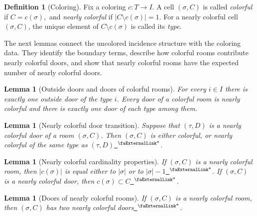 \documentclass{article}
\newtheorem{lemma}[theorem]{Lemma}
\theoremstyle{definition}
\newtheorem{definition}[theorem]{Definition}
\newcommand{\extlink}{~\ensuremath{{}^\text{\faExternalLink*}}}
\begin{document}
\begin{definition}[Coloring]\label{def:coloring}
Fix a coloring $c:T\to I$. A cell $(\sigma,C)$ is called \emph{colorful} if
$C=c(\sigma),$
and \emph{nearly colorful} if
$|C\setminus c(\sigma)|=1.$
For a nearly colorful cell $(\sigma,C)$, the unique element of $C\setminus c(\sigma)$ is called its \emph{type}.
\end{definition}

The next lemmas connect the uncolored incidence structure with the coloring data. They identify the boundary terms, describe how colorful rooms contribute nearly colorful doors, and show that nearly colorful rooms have the expected number of nearly colorful doors.

\begin{lemma}[Outside doors and doors of colorful rooms]\label{lemma:4}
For every $i \in I$ there is exactly one outside door of the type $i$. Every door of a
colorful room is nearly colorful and there is exactly one door of each type among them.
\end{lemma}

\begin{lemma}[Nearly colorful door transition]\label{lemma:5}
Suppose that $(\tau, D)$ is a nearly colorful door of a room $(\sigma, C)$. Then $(\sigma, C)$
is either colorful, or nearly colorful of the same type as $(\tau, D)$\href{https://github.com/Solo-ary/Game-Theory-Formalization/blob/7b49d5267d4f26b17bdf071250880b63e96999b6/Brouwer/Gametheory/Scarf.lean#L1263-L1341}{\extlink}.
\end{lemma}

\begin{lemma}[Nearly colorful cardinality properties]\label{lemma:6}
If $(\sigma, C)$ is a nearly colorful room, then $|c(\sigma)|$ is equal either to $|\sigma|$ or to
$|\sigma| - 1$\href{https://github.com/Solo-ary/Game-Theory-Formalization/blob/7b49d5267d4f26b17bdf071250880b63e96999b6/Brouwer/Gametheory/Scarf.lean#L1370-L1394}{\extlink}. If $(\sigma, C)$ is a nearly colorful door, then $c(\sigma) \subset C$\href{https://github.com/Solo-ary/Game-Theory-Formalization/blob/7b49d5267d4f26b17bdf071250880b63e96999b6/Brouwer/Gametheory/Scarf.lean#L1396-L1420}{\extlink}.
\end{lemma}

\begin{lemma}[Doors of nearly colorful rooms]\label{lemma:7}
If $(\sigma, C)$ is a nearly colorful room, then $(\sigma, C)$ has two nearly colorful doors\href{https://github.com/Solo-ary/Game-Theory-Formalization/blob/7b49d5267d4f26b17bdf071250880b63e96999b6/Brouwer/Gametheory/Scarf.lean#L1562-L2211}{\extlink}.
\end{lemma}
\end{document}
